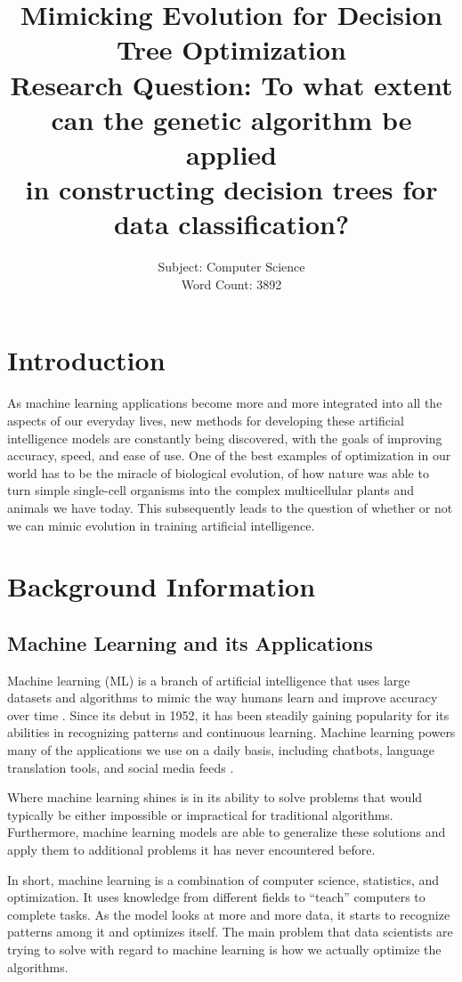 \documentclass[12pt]{article}
\title{
    Mimicking Evolution for Decision Tree Optimization \\ [6pt]
    \large Research Question: To what extent can the genetic algorithm be applied \\
    in constructing decision trees for data classification?
}
\author{
    Subject: Computer Science \\
    Word Count: 3892
}
\date{} %
\begin{document}
\maketitle
\thispagestyle{empty} %
\newpage
{} %
\tableofcontents
\newpage

\section{Introduction}

As machine learning applications become more and more integrated into all the aspects of our everyday lives, new methods for developing these artificial intelligence models are constantly being discovered, with the goals of improving accuracy, speed, and ease of use. One of the best examples of optimization in our world has to be the miracle of biological evolution, of how nature was able to turn simple single-cell organisms into the complex multicellular plants and animals we have today. This subsequently leads to the question of whether or not we can mimic evolution in training artificial intelligence.

\section{Background Information}

\subsection{Machine Learning and its Applications}

Machine learning (ML) is a branch of artificial intelligence that uses large datasets and algorithms to mimic the way humans learn and improve accuracy over time \autocite{what_is_ml_ibm}. Since its debut in 1952, it has been steadily gaining popularity for its abilities in recognizing patterns and continuous learning. Machine learning powers many of the applications we use on a daily basis, including chatbots, language translation tools, and social media feeds \autocite{what_is_ml_mit}.

Where machine learning shines is in its ability to solve problems that would typically be either impossible or impractical for traditional algorithms. Furthermore, machine learning models are able to generalize these solutions and apply them to additional problems it has never encountered before.

In short, machine learning is a combination of computer science, statistics, and optimization. It uses knowledge from different fields to ``teach'' computers to complete tasks. As the model looks at more and more data, it starts to recognize patterns among it and optimizes itself. The main problem that data scientists are trying to solve with regard to machine learning is how we actually optimize the algorithms.
\end{document}
